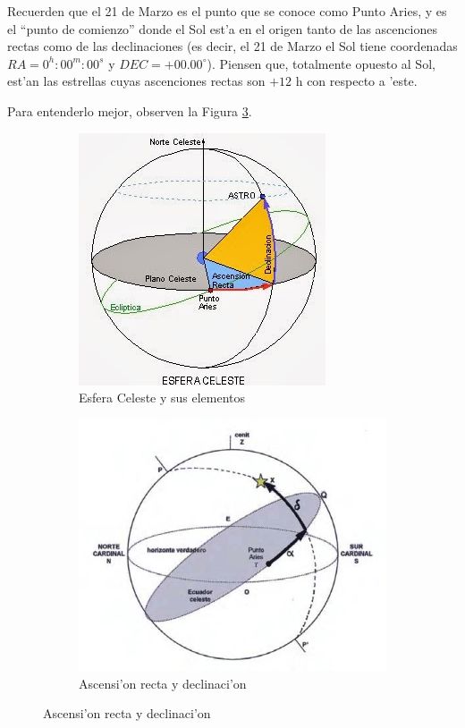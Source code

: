 \documentclass{article}
\begin{document}
\begin{enumerate}[a)]
\begin{enumerate} [i)]
\vspace{3mm}

Recuerden que el 21 de Marzo es el punto que se conoce como Punto Aries, y es el ``punto de comienzo'' donde el Sol est'a en el origen tanto de las ascenciones rectas como de las declinaciones (es decir, el 21 de Marzo el Sol tiene coordenadas $RA = 0^h : 00^m : 00^s$ y $DEC = +00.00^{\circ}$). Piensen que, totalmente opuesto al Sol, est'an las estrellas cuyas ascenciones rectas son $+12$ h con respecto a 'este.

Para entenderlo mejor, observen la Figura \ref{ra_y_dec}. 

\begin{figure}[h!]
\centering
\begin{subfigure}{.5\textwidth}
  \centering
  \includegraphics[width=.6\linewidth]{esfera.jpg}
  \caption{Esfera Celeste y sus elementos}
  \label{fig:sub1}
\end{subfigure}%
\begin{subfigure}{.5\textwidth}
  \centering
  \includegraphics[width=.8\linewidth]{ra_y_dec.png}
  \caption{Ascensi'on recta y declinaci'on}
  \label{fig:sub2}
\end{subfigure}
\caption{Ascensi'on recta y declinaci'on}
\label{ra_y_dec}
\end{figure}


\end{enumerate}
\end{enumerate}
\end{document}
